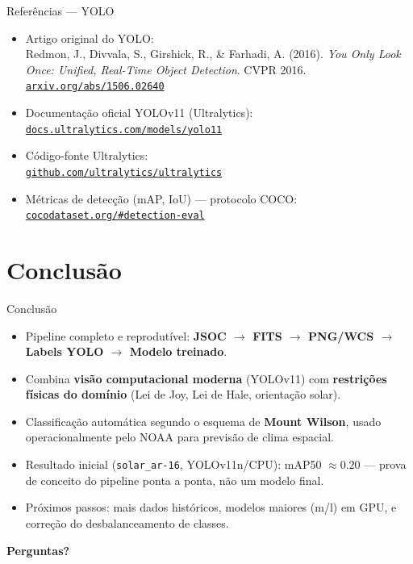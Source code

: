 \documentclass[aspectratio=169]{beamer}
\begin{document}
\begin{frame}{Referências — YOLO}
  \small
  \begin{itemize}
    \item Artigo original do YOLO:\\
      \footnotesize Redmon, J., Divvala, S., Girshick, R., \& Farhadi, A. (2016). \textit{You Only Look Once: Unified, Real-Time Object Detection}. CVPR 2016. \href{https://arxiv.org/abs/1506.02640}{\texttt{arxiv.org/abs/1506.02640}}
    \item \normalsize Documentação oficial YOLOv11 (Ultralytics):\\
      \href{https://docs.ultralytics.com/models/yolo11/}{\texttt{docs.ultralytics.com/models/yolo11}}
    \item \normalsize Código-fonte Ultralytics:\\
      \href{https://github.com/ultralytics/ultralytics}{\texttt{github.com/ultralytics/ultralytics}}
    \item \normalsize Métricas de detecção (mAP, IoU) — protocolo COCO:\\
      \href{https://cocodataset.org/\#detection-eval}{\texttt{cocodataset.org/\#detection-eval}}
  \end{itemize}
\end{frame}

\section{Conclusão}

\begin{frame}{Conclusão}
  \begin{itemize}
    \item Pipeline completo e reprodutível: \textbf{JSOC $\to$ FITS $\to$ PNG/WCS $\to$ Labels YOLO $\to$ Modelo treinado}.
    \item Combina \textbf{visão computacional moderna} (YOLOv11) com \textbf{restrições físicas do domínio} (Lei de Joy, Lei de Hale, orientação solar).
    \item Classificação automática segundo o esquema de \textbf{Mount Wilson}, usado operacionalmente pelo NOAA para previsão de clima espacial.
    \item Resultado inicial (\texttt{solar\_ar-16}, YOLOv11n/CPU): mAP50 $\approx 0.20$ — prova de conceito do pipeline ponta a ponta, não um modelo final.
    \item Próximos passos: mais dados históricos, modelos maiores (m/l) em GPU, e correção do desbalanceamento de classes.
  \end{itemize}
  \vspace{0.5cm}
  \begin{center}
    \Large \textbf{Perguntas?}
  \end{center}
\end{frame}
\end{document}
